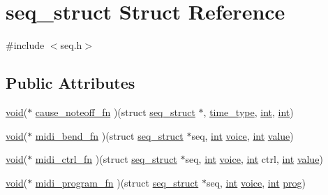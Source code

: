 \hypertarget{structseq__struct}{}\section{seq\+\_\+struct Struct Reference}
\label{structseq__struct}


{\ttfamily \#include $<$seq.\+h$>$}

\subsection*{Public Attributes}
\begin{DoxyCompactItemize}
\item 
\hyperlink{sound_8c_ae35f5844602719cf66324f4de2a658b3}{void}($\ast$ \hyperlink{structseq__struct_aa7837b0e6a76089790b16bdd5f2e951b}{cause\+\_\+noteoff\+\_\+fn} )(struct \hyperlink{structseq__struct}{seq\+\_\+struct} $\ast$, \hyperlink{midifns_8h_a3f787491db5dbc75c21b27d54e9ebae6}{time\+\_\+type}, \hyperlink{xmltok_8h_a5a0d4a5641ce434f1d23533f2b2e6653}{int}, \hyperlink{xmltok_8h_a5a0d4a5641ce434f1d23533f2b2e6653}{int})
\item 
\hyperlink{sound_8c_ae35f5844602719cf66324f4de2a658b3}{void}($\ast$ \hyperlink{structseq__struct_affda5ec2ecdb197885828ea556215d80}{midi\+\_\+bend\+\_\+fn} )(struct \hyperlink{structseq__struct}{seq\+\_\+struct} $\ast$seq, \hyperlink{xmltok_8h_a5a0d4a5641ce434f1d23533f2b2e6653}{int} \hyperlink{seqread_8c_adc9c046fb3ac286b5dc54bb302aedecc}{voice}, \hyperlink{xmltok_8h_a5a0d4a5641ce434f1d23533f2b2e6653}{int} \hyperlink{lib_2expat_8h_a4a30a13b813682e68c5b689b45c65971}{value})
\item 
\hyperlink{sound_8c_ae35f5844602719cf66324f4de2a658b3}{void}($\ast$ \hyperlink{structseq__struct_a58780a55ec0f3ff87db12dfe8a76fc85}{midi\+\_\+ctrl\+\_\+fn} )(struct \hyperlink{structseq__struct}{seq\+\_\+struct} $\ast$seq, \hyperlink{xmltok_8h_a5a0d4a5641ce434f1d23533f2b2e6653}{int} \hyperlink{seqread_8c_adc9c046fb3ac286b5dc54bb302aedecc}{voice}, \hyperlink{xmltok_8h_a5a0d4a5641ce434f1d23533f2b2e6653}{int} ctrl, \hyperlink{xmltok_8h_a5a0d4a5641ce434f1d23533f2b2e6653}{int} \hyperlink{lib_2expat_8h_a4a30a13b813682e68c5b689b45c65971}{value})
\item 
\hyperlink{sound_8c_ae35f5844602719cf66324f4de2a658b3}{void}($\ast$ \hyperlink{structseq__struct_a20228dc9f25c2f1d37f0902e98138620}{midi\+\_\+program\+\_\+fn} )(struct \hyperlink{structseq__struct}{seq\+\_\+struct} $\ast$seq, \hyperlink{xmltok_8h_a5a0d4a5641ce434f1d23533f2b2e6653}{int} \hyperlink{seqread_8c_adc9c046fb3ac286b5dc54bb302aedecc}{voice}, \hyperlink{xmltok_8h_a5a0d4a5641ce434f1d23533f2b2e6653}{int} \hyperlink{xlcont_8c_afcbac1e10c923b168912e1978b7a2d06}{prog})

\end{DoxyCompactItemize}
